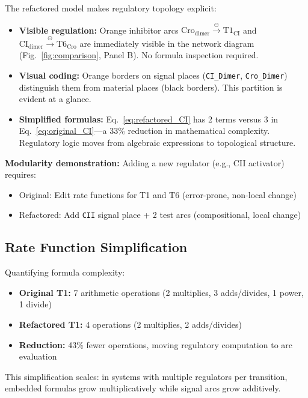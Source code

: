 \documentclass[twocolumn,10pt]{article}
\begin{document}
The refactored model makes regulatory topology explicit:

\begin{itemize}
\item \textbf{Visible regulation:} Orange inhibitor arcs $\text{Cro}_{\text{dimer}} \xrightarrow{\ominus} \text{T1}_{\text{CI}}$ and $\text{CI}_{\text{dimer}} \xrightarrow{\ominus} \text{T6}_{\text{Cro}}$ are immediately visible in the network diagram (Fig.~\ref{fig:comparison}, Panel B). No formula inspection required.
  
\item \textbf{Visual coding:} Orange borders on signal places (\texttt{CI\_Dimer}, \texttt{Cro\_Dimer}) distinguish them from material places (black borders). This partition is evident at a glance.
  
\item \textbf{Simplified formulas:} Eq.~\ref{eq:refactored_CI} has 2 terms versus 3 in Eq.~\ref{eq:original_CI}---a 33\% reduction in mathematical complexity. Regulatory logic moves from algebraic expressions to topological structure.
\end{itemize}

\textbf{Modularity demonstration:} Adding a new regulator (e.g., CII activator) requires:
\begin{itemize}
\item Original: Edit rate functions for T1 and T6 (error-prone, non-local change)
\item Refactored: Add \texttt{CII} signal place + 2 test arcs (compositional, local change)
\end{itemize}

\subsection{Rate Function Simplification}

Quantifying formula complexity:
\begin{itemize}
\item \textbf{Original T1:} 7 arithmetic operations (2 multiplies, 3 adds/divides, 1 power, 1 divide)
\item \textbf{Refactored T1:} 4 operations (2 multiplies, 2 adds/divides)
\item \textbf{Reduction:} 43\% fewer operations, moving regulatory computation to arc evaluation
\end{itemize}

This simplification scales: in systems with multiple regulators per transition, embedded formulas grow multiplicatively while signal arcs grow additively.
\end{document}
